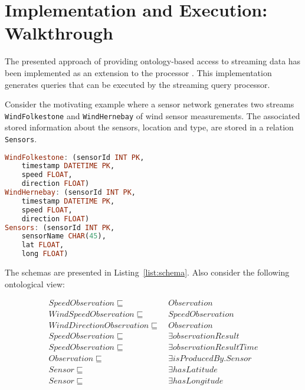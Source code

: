 \section{Implementation and Execution: Walkthrough}
\label{execution}

The presented approach of providing ontology-based access to streaming data has been implemented as an extension to the \odemapster processor \cite{Barrasa_04}. 
This implementation generates \sneeql queries that can be executed by the streaming query processor.


Consider the motivating example where a sensor network generates two streams \texttt{WindFolkestone} and \texttt{WindHernebay} of wind sensor measurements.
The associated stored information about the sensors, \eg location and type, are stored in a relation \texttt{Sensors}.

\begin{lstlisting}[style=SNEEqlStyle,language=Haskell,label=list:schema,caption=Relational schema of the stream data source.]
WindFolkestone: (sensorId INT PK, 
	timestamp DATETIME PK, 
	speed FLOAT, 
	direction FLOAT)
WindHernebay: (sensorId INT PK, 
	timestamp DATETIME PK, 
	speed FLOAT, 
	direction FLOAT)
Sensors: (sensorId INT PK, 
	sensorName CHAR(45), 
	lat FLOAT, 
	long FLOAT)
\end{lstlisting}

The schemas are presented in Listing~\ref{list:schema}. Also consider the following ontological view:

\small
\begin{align*}%
SpeedObservation \sqsubseteq\ & Observation \\
WindSpeedObservation \sqsubseteq\ & SpeedObservation \\
WindDirectionObservation \sqsubseteq\ & Observation \\
SpeedObservation \sqsubseteq\ & \exists observationResult \\
SpeedObservation \sqsubseteq\ & \exists observationResultTime \\
Observation \sqsubseteq\ & \exists isProducedBy.Sensor \\
Sensor \sqsubseteq\ & \exists hasLatitude \\
Sensor \sqsubseteq\ & \exists hasLongitude \\
\end{align*}

